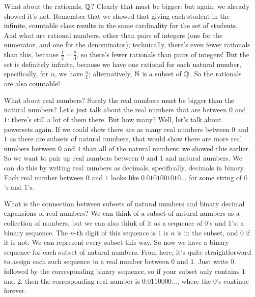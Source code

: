 What about the rationals, $\mathbb{Q}$?
Clearly that must be bigger: but again, we already showed it's not.
Remember that we showed that giving each student in the infinite, countable class results in the same cardinality for the set of students.
And what are rational numbers, other than pairs of integers (one for the numerator, and one for the denominator); technically, there's even fewer rationals than this, because $\frac{1}{2} = \frac{2}{4}$, so there's fewer rationals than pairs of integers! 
But the set is definitely infinite, because we have one rational for each natural number, specifically, for $n$, we have $\frac{n}{1}$; alternatively, $\mathbb{N}$ is a subset of $\mathbb{Q}$.
So the rationals are also countable!

What about real numbers?
Surely the real numbers must be bigger than the natural numbers?
Let's just talk about the real numbers that are between $0$ and $1$: there's still a lot of them there.
But how many?
Well, let's talk about powersets again.
If we could show there are as many real numbers between $0$ and $1$ as there are subsets of natural numbers, that would show there are more real numbers between $0$ and $1$ than all of the natural numbers: we showed this earlier.
So we want to pair up real numbers between $0$ and $1$ and natural numbers.
We can do this by writing real numbers as decimals, specifically, decimals in binary. 
Each real number between $0$ and $1$ looks like $0.0101001010\ldots$ for some string of $0$'s and $1$'s.

What is the connection between subsets of natural numbers and binary decimal expansions of real numbers?
We can think of a subset of natural numbers as a collection of numbers, but we can also think of it as a sequence of $0$'s and $1$'s: a binary sequence.
The $n$-th digit of this sequence is $1$ is $n$ is in the subset, and $0$ if it is not.
We can represent every subset this way. 
So now we have a binary sequence for each subset of natural numbers.
From here, it's quite straightforward to assign each such sequence to a real number between $0$ and $1$.
Just write $0.$ followed by the corresponding binary sequence, so if your subset only contains $1$ and $2$, then the corresponding real number is $0.0110000\ldots$, where the $0$'s continue forever.

